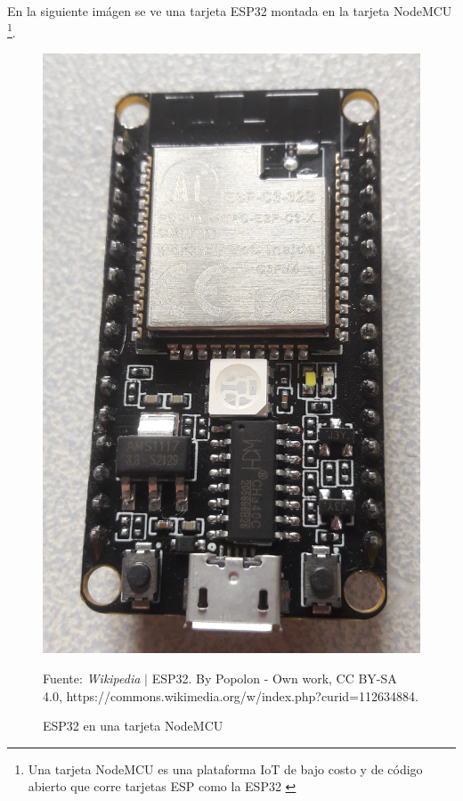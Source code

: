 \documentclass[conference]{IEEEtran}
\begin{document}
    \bigbreak

    En la siguiente imágen se ve una tarjeta ESP32 montada en la tarjeta
    NodeMCU \footnote{Una tarjeta NodeMCU es una plataforma IoT de bajo costo
    y de código abierto que corre tarjetas ESP como la ESP32
    \cite{wikipedia-mcu-2022B}}.

    \begin{figure}[H]
        \centering
        \includegraphics[width=0.3\paperwidth]{images/esp32-board}
        \caption{ESP32 en una tarjeta NodeMCU} \footnotesize
        Fuente: \textit{Wikipedia} $\mid$ ESP32. By Popolon - Own work, CC
        BY-SA 4.0, https://commons.wikimedia.org/w/index.php?curid=112634884.
    \end{figure}
\end{document}
